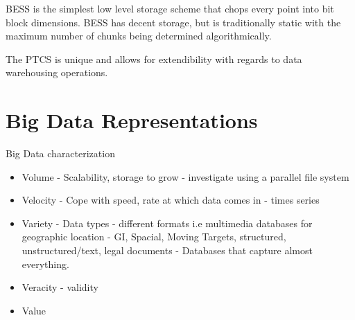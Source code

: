 BESS is the simplest low level storage scheme that chops every point into bit block dimensions. BESS has decent storage, but is traditionally static with the maximum number of chunks being determined algorithmically.

The PTCS is unique and allows for extendibility with regards to data warehousing operations.


\section{Big Data Representations}

Big Data characterization
\begin{itemize}
	\item Volume - Scalability, storage to grow - investigate using a parallel file system
	\item Velocity - Cope with speed, rate at which data comes in - times series
	\item Variety - Data types - different formats i.e multimedia databases for geographic location - GI, Spacial, Moving Targets, structured, unstructured/text, legal documents - Databases that capture almost everything.
	\item Veracity - validity
	\item Value
\end{itemize}

